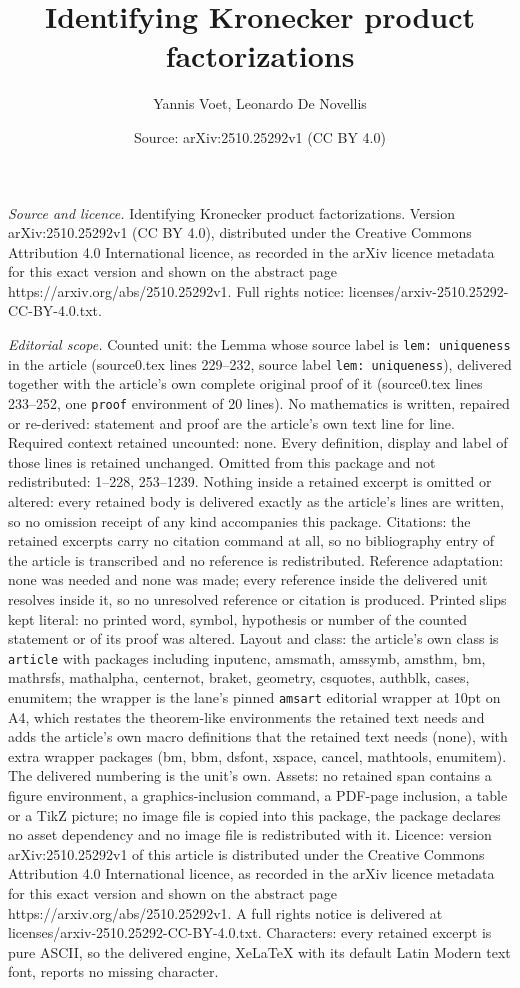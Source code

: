 \documentclass[10pt,a4paper]{amsart}
\title[Identifying Kronecker product factorizations]{Identifying Kronecker product factorizations}
\author{Yannis Voet, Leonardo De Novellis}
\date{Source: arXiv:2510.25292v1 (CC BY 4.0)}
\begin{document}
\maketitle

\noindent\emph{Source and licence.} Identifying Kronecker product factorizations. Version arXiv:2510.25292v1 (CC BY 4.0), distributed under the Creative Commons Attribution 4.0 International licence, as recorded in the arXiv licence metadata for this exact version and shown on the abstract page https://arxiv.org/abs/2510.25292v1. Full rights notice: licenses/arxiv-2510.25292-CC-BY-4.0.txt.\par\smallskip

\noindent\textit{Editorial scope.} Counted unit: the Lemma whose source label is \texttt{lem: uniqueness} in the article (source0.tex lines 229--232, source label \texttt{lem: uniqueness}), delivered together with the article's own complete original proof of it (source0.tex lines 233--252, one \texttt{proof} environment of 20 lines). No mathematics is written, repaired or re-derived: statement and proof are the article's own text line for line. Required context retained uncounted: none. Every definition, display and label of those lines is retained unchanged. Omitted from this package and not redistributed: 1--228, 253--1239. Nothing inside a retained excerpt is omitted or altered: every retained body is delivered exactly as the article's lines are written, so no omission receipt of any kind accompanies this package. Citations: the retained excerpts carry no citation command at all, so no bibliography entry of the article is transcribed and no reference is redistributed. Reference adaptation: none was needed and none was made; every reference inside the delivered unit resolves inside it, so no unresolved reference or citation is produced. Printed slips kept literal: no printed word, symbol, hypothesis or number of the counted statement or of its proof was altered. Layout and class: the article's own class is \texttt{article} with packages including inputenc, amsmath, amssymb, amsthm, bm, mathrsfs, mathalpha, centernot, braket, geometry, csquotes, authblk, cases, enumitem; the wrapper is the lane's pinned \texttt{amsart} editorial wrapper at 10pt on A4, which restates the theorem-like environments the retained text needs and adds the article's own macro definitions that the retained text needs (none), with extra wrapper packages (bm, bbm, dsfont, xspace, cancel, mathtools, enumitem). The delivered numbering is the unit's own. Assets: no retained span contains a figure environment, a graphics-inclusion command, a PDF-page inclusion, a table or a TikZ picture; no image file is copied into this package, the package declares no asset dependency and no image file is redistributed with it. Licence: version arXiv:2510.25292v1 of this article is distributed under the Creative Commons Attribution 4.0 International licence, as recorded in the arXiv licence metadata for this exact version and shown on the abstract page https://arxiv.org/abs/2510.25292v1. A full rights notice is delivered at licenses/arxiv-2510.25292-CC-BY-4.0.txt. Characters: every retained excerpt is pure ASCII, so the delivered engine, XeLaTeX with its default Latin Modern text font, reports no missing character.
\end{document}
